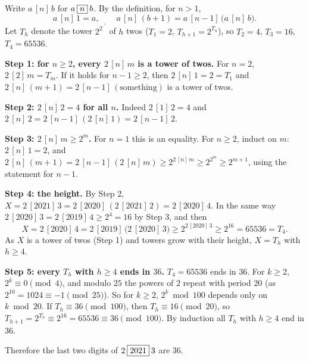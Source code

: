 Write $a\,[n]\,b$ for $a\mathbin{\fbox{$n$}}b$. By the definition, for $n>1$,
\[a\,[n]\,1=a,\qquad a\,[n]\,(b+1)=a\,[n-1]\,\bigl(a\,[n]\,b\bigr).\]
Let $T_h$ denote the tower $2^{2^{\cdot^{\cdot^{2}}}}$ of $h$ twos ($T_1=2$, $T_{h+1}=2^{T_h}$), so $T_2=4$, $T_3=16$, $T_4=65536$.

\textbf{Step 1: for $n\ge2$, every $2\,[n]\,m$ is a tower of twos.} For $n=2$, $2\,[2]\,m=T_m$. If it holds for $n-1\ge2$, then $2\,[n]\,1=2=T_1$ and $2\,[n]\,(m+1)=2\,[n-1]\,(\text{something})$ is a tower of twos.

\textbf{Step 2: $2\,[n]\,2=4$ for all $n$.} Indeed $2\,[1]\,2=4$ and $2\,[n]\,2=2\,[n-1]\,(2\,[n]\,1)=2\,[n-1]\,2$.

\textbf{Step 3: $2\,[n]\,m\ge2^m$.} For $n=1$ this is an equality. For $n\ge2$, induct on $m$: $2\,[n]\,1=2$, and $2\,[n]\,(m+1)=2\,[n-1]\,(2\,[n]\,m)\ge2^{2\,[n]\,m}\ge2^{2^m}\ge2^{m+1}$, using the statement for $n-1$.

\textbf{Step 4: the height.} By Step 2, $X=2\,[2021]\,3=2\,[2020]\,(2\,[2021]\,2)=2\,[2020]\,4$. In the same way $2\,[2020]\,3=2\,[2019]\,4\ge2^4=16$ by Step 3, and then
\[X=2\,[2020]\,4=2\,[2019]\,\bigl(2\,[2020]\,3\bigr)\ge2^{2\,[2020]\,3}\ge2^{16}=65536=T_4.\]
As $X$ is a tower of twos (Step 1) and towers grow with their height, $X=T_h$ with $h\ge4$.

\textbf{Step 5: every $T_h$ with $h\ge4$ ends in $36$.} $T_4=65536$ ends in $36$. For $k\ge2$, $2^k\equiv0\pmod4$, and modulo $25$ the powers of $2$ repeat with period $20$ (as $2^{10}=1024\equiv-1\pmod{25}$). So for $k\ge2$, $2^k\bmod100$ depends only on $k\bmod20$. If $T_h\equiv36\pmod{100}$, then $T_h\equiv16\pmod{20}$, so $T_{h+1}=2^{T_h}\equiv2^{16}=65536\equiv36\pmod{100}$. By induction all $T_h$ with $h\ge4$ end in $36$.

Therefore the last two digits of $2\mathbin{\fbox{$2021$}}3$ are $\boxed{36}$.
